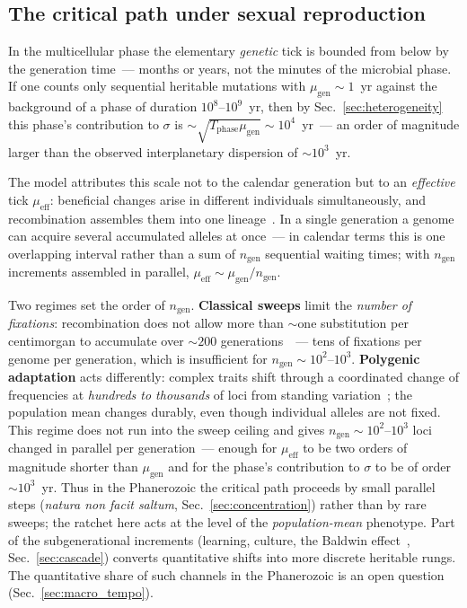 \documentclass[11pt,a4paper]{article}
\begin{document}
\subsection{The critical path under sexual reproduction}
\label{sec:sex}

In the multicellular phase the elementary \emph{genetic} tick is bounded from below by the generation time~--- months or years, not the minutes of the microbial phase. If one counts only sequential heritable mutations with $\mu_{\mathrm{gen}}\sim1$~yr against the background of a phase of duration $10^8$--$10^9$~yr, then by Sec.~\ref{sec:heterogeneity} this phase's contribution to $\sigma$ is $\sim\sqrt{T_{\mathrm{phase}}\mu_{\mathrm{gen}}}\sim10^4$~yr~--- an order of magnitude larger than the observed interplanetary dispersion of $\sim10^3$~yr.

The model attributes this scale not to the calendar generation but to an \emph{effective} tick $\mu_{\mathrm{eff}}$: beneficial changes arise in different individuals simultaneously, and recombination assembles them into one lineage~\cite{Muller1932,HillRobertson1966,Colegrave2002}. In a single generation a genome can acquire several accumulated alleles at once~--- in calendar terms this is one overlapping interval rather than a sum of $n_{\mathrm{gen}}$ sequential waiting times; with $n_{\mathrm{gen}}$ increments assembled in parallel, $\mu_{\mathrm{eff}}\sim\mu_{\mathrm{gen}}/n_{\mathrm{gen}}$.

Two regimes set the order of $n_{\mathrm{gen}}$. \textbf{Classical sweeps} limit the \emph{number of fixations}: recombination does not allow more than $\sim$one substitution per centimorgan to accumulate over $\sim200$ generations~\cite{WeissmanBarton2012}~--- tens of fixations per genome per generation, which is insufficient for $n_{\mathrm{gen}}\sim10^2$--$10^3$. \textbf{Polygenic adaptation} acts differently: complex traits shift through a coordinated change of frequencies at \emph{hundreds to thousands} of loci from standing variation~\cite{Pritchard2010,Boyle2017,Barghi2020}; the population mean changes durably, even though individual alleles are not fixed. This regime does not run into the sweep ceiling and gives $n_{\mathrm{gen}}\sim10^2$--$10^3$ loci changed in parallel per generation~--- enough for $\mu_{\mathrm{eff}}$ to be two orders of magnitude shorter than $\mu_{\mathrm{gen}}$ and for the phase's contribution to $\sigma$ to be of order $\sim10^3$~yr. Thus in the Phanerozoic the critical path proceeds by small parallel steps (\emph{natura non facit saltum}, Sec.~\ref{sec:concentration}) rather than by rare sweeps; the ratchet here acts at the level of the \emph{population-mean} phenotype. Part of the subgenerational increments (learning, culture, the Baldwin effect~\cite{Baldwin1896}, Sec.~\ref{sec:cascade}) converts quantitative shifts into more discrete heritable rungs. The quantitative share of such channels in the Phanerozoic is an open question (Sec.~\ref{sec:macro_tempo}).
\end{document}
